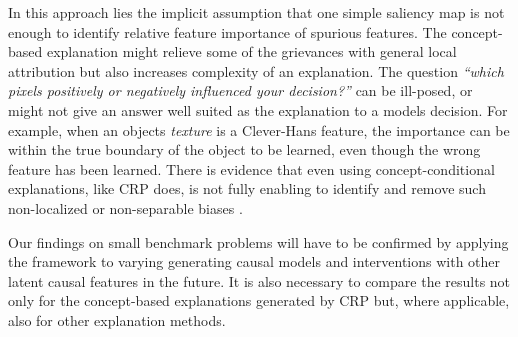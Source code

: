 In this approach lies the implicit assumption that one simple saliency map is not enough to identify relative feature importance of spurious features. The concept-based explanation might relieve some of the grievances with general local attribution but also increases complexity of an explanation. 
The question \textit{``which pixels positively or negatively influenced your decision?''} can be ill-posed, or might not give an answer well suited as the explanation to a models decision. For example, when an objects \textit{texture} is a Clever-Hans feature, the importance can be within the true boundary of the object to be learned, even though the wrong feature has been learned. There is evidence that even using concept-conditional explanations, like CRP does, is not fully enabling to identify and remove such non-localized or non-separable biases \cite{Dreyer2023a}. 

Our findings on small benchmark problems will have to be confirmed by applying the framework to varying generating causal models and interventions with other latent causal features in the future. 
It is also necessary to compare the results not only for the concept-based explanations generated by CRP but, where applicable, also for other explanation methods.

